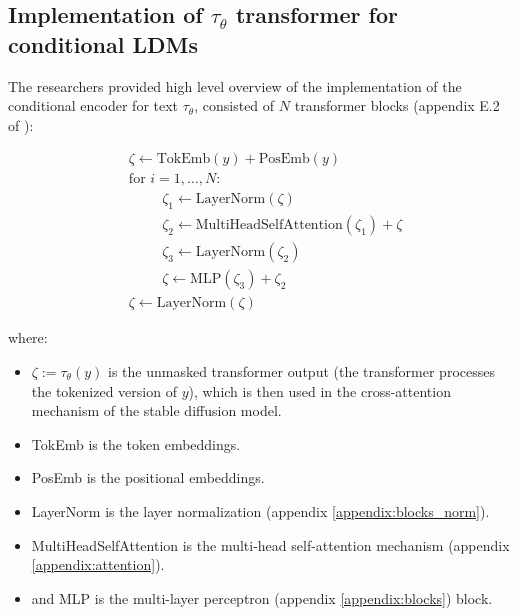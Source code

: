 \subsection{Implementation of $\tau_\theta$ transformer for conditional LDMs}

The researchers provided high level overview of the implementation of the conditional encoder for text $\tau_\theta$, consisted of $N$ transformer blocks (appendix E.2 of \cite{stable_diffusion}):

\begin{align*}
    &\zeta \leftarrow \text{TokEmb}(y) + \text{PosEmb}(y) \\
    &\text{for } i = 1, \ldots, N : \\
        &\hspace{1cm} \zeta_1 \leftarrow \text{LayerNorm}(\zeta) \\
        &\hspace{1cm} \zeta_2 \leftarrow \text{MultiHeadSelfAttention}(\zeta_1) + \zeta \\
        &\hspace{1cm} \zeta_3 \leftarrow \text{LayerNorm}(\zeta_2) \\
        &\hspace{1cm} \zeta \leftarrow \text{MLP}(\zeta_3) + \zeta_2 \\
    &\zeta \leftarrow \text{LayerNorm}(\zeta)
\end{align*}

where:

\begin{itemize}
    \item $\zeta := \tau_\theta(y)$ is the unmasked transformer output (the transformer processes the tokenized version of $y$), which is then used in the cross-attention mechanism of the stable diffusion model.
    \item TokEmb is the token embeddings.
    \item PosEmb is the positional embeddings.
    \item LayerNorm is the layer normalization (appendix \ref{appendix:blocks_norm}).
    \item MultiHeadSelfAttention is the multi-head self-attention mechanism (appendix \ref{appendix:attention}).
    \item and MLP is the multi-layer perceptron (appendix \ref{appendix:blocks}) block.
\end{itemize}


